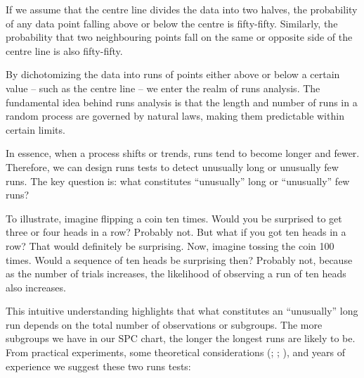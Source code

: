 \documentclass[
]{book}
\begin{document}
If we assume that the centre line divides the data into two halves, the probability of any data point falling above or below the centre is fifty-fifty. Similarly, the probability that two neighbouring points fall on the same or opposite side of the centre line is also fifty-fifty.

By dichotomizing the data into runs of points either above or below a certain value -- such as the centre line -- we enter the realm of runs analysis. The fundamental idea behind runs analysis is that the length and number of runs in a random process are governed by natural laws, making them predictable within certain limits.

In essence, when a process shifts or trends, runs tend to become longer and fewer. Therefore, we can design runs tests to detect unusually long or unusually few runs. The key question is: what constitutes ``unusually'' long or ``unusually'' few runs?

To illustrate, imagine flipping a coin ten times. Would you be surprised to get three or four heads in a row? Probably not. But what if you got ten heads in a row? That would definitely be surprising. Now, imagine tossing the coin 100 times. Would a sequence of ten heads be surprising then? Probably not, because as the number of trials increases, the likelihood of observing a run of ten heads also increases.

This intuitive understanding highlights that what constitutes an ``unusually'' long run depends on the total number of observations or subgroups. The more subgroups we have in our SPC chart, the longer the longest runs are likely to be. From practical experiments, some theoretical considerations (; ; ), and years of experience we suggest these two runs tests:
\end{document}
